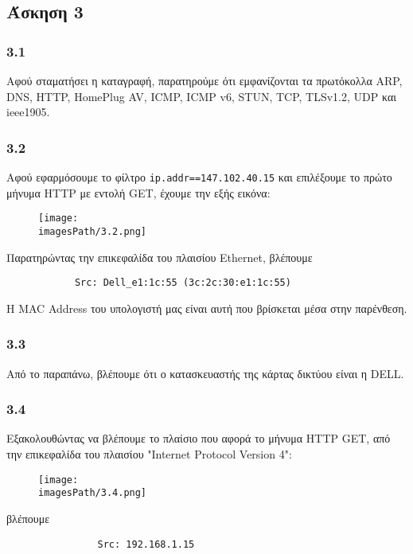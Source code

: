 	\subsection*{Άσκηση 3}
	
		\subsubsection*{3.1}
			Αφού σταματήσει η καταγραφή, παρατηρούμε ότι εμφανίζονται τα πρωτόκολλα ARP, DNS, HTTP, HomePlug AV, ICMP, ICMP v6, STUN, TCP, TLSv1.2, UDP και ieee1905.
		
		\subsubsection*{3.2}
			Αφού εφαρμόσουμε το φίλτρο \verb|ip.addr==147.102.40.15| και επιλέξουμε το πρώτο μήνυμα HTTP με εντολή GET, έχουμε την εξής εικόνα:
			
			\begin{figure}[H]
				\texttt{[image: \\imagesPath/3.2.png]}
			\end{figure}
		
		Παρατηρώντας την επικεφαλίδα του πλαισίου Ethernet, βλέπουμε 
		\begin{verbatim}
			Src: Dell_e1:1c:55 (3c:2c:30:e1:1c:55)
		\end{verbatim}
		
		Η MAC Address του υπολογιστή μας είναι αυτή που βρίσκεται μέσα στην παρένθεση.
		
		\subsubsection*{3.3}
			Από το παραπάνω, βλέπουμε ότι ο κατασκευαστής της κάρτας δικτύου είναι η DELL.
		
		\subsubsection*{3.4}
			Εξακολουθώντας να βλέπουμε το πλαίσιο που αφορά το μήνυμα HTTP GET, από την επικεφαλίδα του πλαισίου "Internet Protocol Version 4":
			
			\begin{figure}[H]
				\texttt{[image: \\imagesPath/3.4.png]}
			\end{figure}
		
			βλέπουμε 
			
			\begin{verbatim}
				Src: 192.168.1.15
			\end{verbatim}
		
